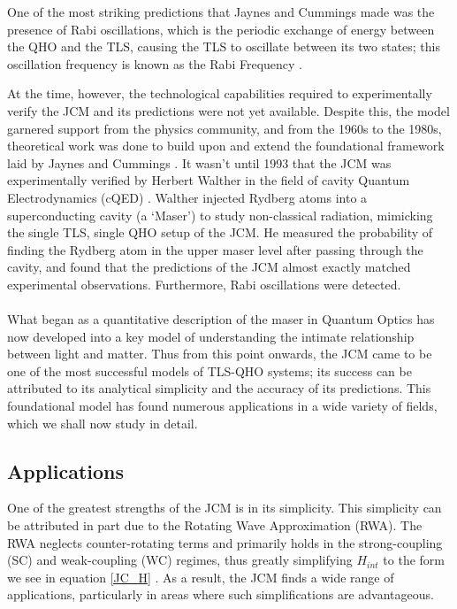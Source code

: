 \documentclass[12pt,a4paper]{article}
\begin{document}
One of the most striking predictions that Jaynes and Cummings made was the presence of Rabi oscillations, which is the periodic exchange of energy between the QHO and the TLS, causing the TLS to oscillate between its two states; this oscillation frequency is known as the Rabi Frequency \cite{Context_-Rabi_oscillations}. 

At the time, however, the technological capabilities required to experimentally verify the JCM and its predictions were not yet available. Despite this, the model garnered support from the physics community, and from the 1960s to the 1980s, theoretical work was done to build upon and extend the foundational framework laid by Jaynes and Cummings \cite{Context1965-TheoreticalJCM, Context1980-TheoreticalJCM, Context1984-TheoreticalJCM}. It wasn't until 1993 that the JCM was experimentally verified by Herbert Walther in the field of cavity Quantum Electrodynamics (cQED) \cite{Context1993-JC_Verification}. Walther injected Rydberg atoms into a superconducting cavity (a `Maser') to study non-classical radiation, mimicking the single TLS, single QHO setup of the JCM. He measured the probability of finding the Rydberg atom in the upper maser level after passing through the cavity, and found that the predictions of the JCM almost exactly matched experimental observations. Furthermore, Rabi oscillations were detected.\\
\\
What began as a quantitative description of the maser in Quantum Optics has now developed into a key model of understanding the intimate relationship between light and matter. Thus from this point onwards, the JCM came to be one of the most successful models of TLS-QHO systems; its success can be attributed to its analytical simplicity and the accuracy of its predictions. This foundational model has found numerous applications in a wide variety of fields, which we shall now study in detail.

\subsection{Applications} \label{JCM_apps}

One of the greatest strengths of the JCM is in its simplicity. This simplicity can be attributed in part due to the Rotating Wave Approximation (RWA). The RWA neglects counter-rotating terms and primarily holds in the strong-coupling (SC) and weak-coupling (WC) regimes, thus greatly simplifying $H_{int}$ to the form we see in equation \eqref{JC_H} \cite{General2010_USC_failure}. As a result,  the JCM finds a wide range of applications, particularly in areas where such simplifications are advantageous.
\end{document}
